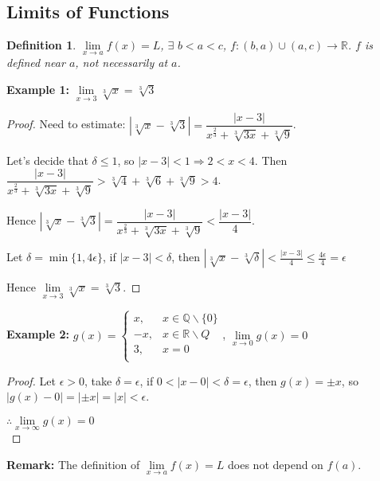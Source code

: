 \documentclass[12pt]{article}
\newcommand{\abs}[1]{\left| #1 \right|}
\theoremstyle{plain}
\newtheorem{definition}{Definition}[subsection]
\newcommand{\dlim}{\displaystyle\lim\limits}
\begin{document}
    \newpage
    \subsection{Limits of Functions}
    \begin{definition}
        $\dlim_{x\to a} f(x) = L$, 
        $\exists\,\, b < a < c$, $f: (b,a) \cup (a,c) \to \mathbb{R}$.
        $f$ is defined near $a$, not necessarily at $a$.\\
    \end{definition}

    {\color{Brown}\textbf{Example 1:} $\dlim_{x\to3}\sqrt[3] x = \sqrt[3]3$
    \begin{proof}
    Need to estimate: $\abs{\sqrt[3]x -\sqrt[3]3} 
    = \dfrac{\abs{x-3}}{x^{\frac23}+\sqrt [3] {3x} + \sqrt[3]9}$.

    Let's decide that $\delta \leq 1$, so $\abs{x-3} <1 \Rightarrow 2<x<4$.
    Then $\dfrac{\abs{x-3}}{x^{\frac23}+\sqrt [3] {3x} + \sqrt[3]9}
    >\sqrt[3]4 +\sqrt[3]6+\sqrt[3]9>4$.
    
    Hence $\abs{\sqrt[3]x -\sqrt[3]3} 
    = \dfrac{\abs{x-3}}{x^{\frac23}+\sqrt [3] {3x} + \sqrt[3]9}
    < \dfrac{\abs{x-3}}{4}$.

    Let $\delta = \min\{1, 4\epsilon\}$, if $\abs{x-3}<\delta$, 
    then $\abs{\sqrt[3]x -\sqrt[3]\delta}<\frac{\abs{x-3}}4\leq \frac{4\epsilon}4 =\epsilon$

    Hence $\dlim_{x\to3}\sqrt[3] x = \sqrt[3]3$.
    \end{proof}

    \textbf{Example 2:} $g(x) = \begin{cases}
        x, & x\in \mathbb{Q} \backslash\{0\}\\
        -x, & x\in \mathbb{R} \backslash Q\\
        3, &x=0\\
        \end{cases}$, $\dlim_{x\to 0} g(x)=0$
    
    \begin{proof}
        Let $\epsilon > 0$, take $\delta= \epsilon$, 
        if $0<\abs{x-0}<\delta=\epsilon$, then $g(x)=\pm x$,
        so $\abs{g(x)-0}=\abs{\pm x}=\abs{x}<\epsilon$.
        
        $\therefore \dlim_{x\to\infty}g(x)=0$\\
    \end{proof}}
    

    \textbf{Remark:} The definition of $\dlim_{x\to a} f(x)=L$ 
    does not depend on $f(a)$.
\end{document}
